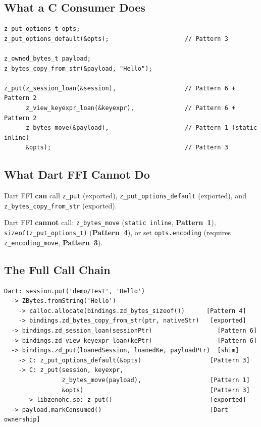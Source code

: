 \documentclass[11pt,a4paper]{article}
\newcommand{\code}[1]{\texttt{#1}}
\newcommand{\fn}[1]{\texttt{#1}}
\newcommand{\pattern}[1]{\textbf{Pattern~#1}}
\begin{document}
\subsection{What a C Consumer Does}

\begin{lstlisting}[style=cstyle]
z_put_options_t opts;
z_put_options_default(&opts);                     // Pattern 3

z_owned_bytes_t payload;
z_bytes_copy_from_str(&payload, "Hello");

z_put(z_session_loan(&session),                   // Pattern 6 + Pattern 2
      z_view_keyexpr_loan(&keyexpr),              // Pattern 6 + Pattern 2
      z_bytes_move(&payload),                     // Pattern 1 (static inline)
      &opts);                                     // Pattern 3
\end{lstlisting}

\subsection{What Dart FFI Cannot Do}

Dart FFI \textbf{can} call \fn{z\_put} (exported),
\fn{z\_put\_\allowbreak{}options\_default} (exported),
and \fn{z\_bytes\_\allowbreak{}copy\_from\_str} (exported).

Dart FFI \textbf{cannot} call:
\fn{z\_bytes\_move} (\code{static inline}, \pattern{1}),
\code{sizeof(z\_put\_\allowbreak{}options\_t)} (\pattern{4}),
or set \code{opts.\allowbreak{}encoding}
(requires \fn{z\_encoding\_move}, \pattern{3}).

\subsection{The Full Call Chain}

\begin{lstlisting}[style=shellstyle,basicstyle=\ttfamily\footnotesize\color{shellForeground}]
Dart: session.put('demo/test', 'Hello')
  -> ZBytes.fromString('Hello')
    -> calloc.allocate(bindings.zd_bytes_sizeof())      [Pattern 4]
    -> bindings.zd_bytes_copy_from_str(ptr, nativeStr)   [exported]
  -> bindings.zd_session_loan(sessionPtr)                  [Pattern 6]
  -> bindings.zd_view_keyexpr_loan(kePtr)                  [Pattern 6]
  -> bindings.zd_put(loanedSession, loanedKe, payloadPtr)  [shim]
    -> C: z_put_options_default(&opts)                   [Pattern 3]
    -> C: z_put(session, keyexpr,
                z_bytes_move(payload),                   [Pattern 1]
                &opts)                                   [Pattern 3]
      -> libzenohc.so: z_put()                           [exported]
  -> payload.markConsumed()                              [Dart ownership]
\end{lstlisting}
\end{document}

